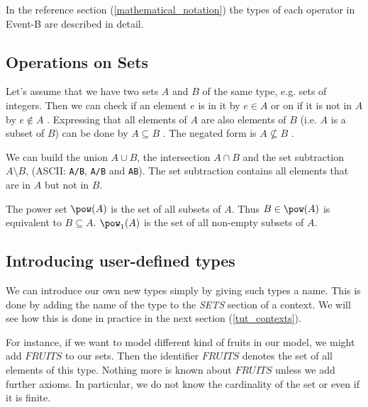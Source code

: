 
In the reference section (\ref{mathematical_notation}) the types of each operator in Event-B are described in detail.

\subsection{Operations on Sets}
\label{tut_operations_on_sets}
Let's assume that we have two sets $A$ and $B$ of the same type, e.g. sets of integers.
Then we can check if an element $e$ is in it by $e\in A$  or 
on if it is not in $A$ by $e\notin A$ .
Expressing that all elements of $A$ are also elements of $B$ (i.e. $A$ is a subset of $B$) can
be done by $A\subseteq B$ . The negated form is $A\not\subseteq B$ .

We can build the union $A\cup B$, the intersection $A\cap B$ and the set subtraction $A\setminus B$,
(ASCII: \texttt{A\mybackslash{}/B}, \texttt{A/\mybackslash{}B} and \texttt{A\mybackslash{}B}). The
set subtraction contains all elements that are in $A$ but not in $B$.

The power set $\pow(A)$  is the set of all subsets of $A$.
Thus $B\in\pow(A)$ is equivalent to $B\subseteq A$.
$\pow_1(A)$  is the set of all non-empty subsets of $A$.

\subsection{Introducing user-defined types}
\label{tut_user_defined_sets}

We can introduce our own new types simply by giving such types a name.
This is done by adding the name of the type to the \textsl{SETS} section of a context.
We will see how this is done in practice in the next section (\ref{tut_contexts}).

For instance, if we want to model different kind of fruits in our model, we might add $FRUITS$ to our
sets. Then the identifier $FRUITS$ denotes the set of all elements of this type. Nothing more is known about $FRUITS$ unless we add further axioms. In particular, we do not
know the cardinality of the set or even if it is finite.

